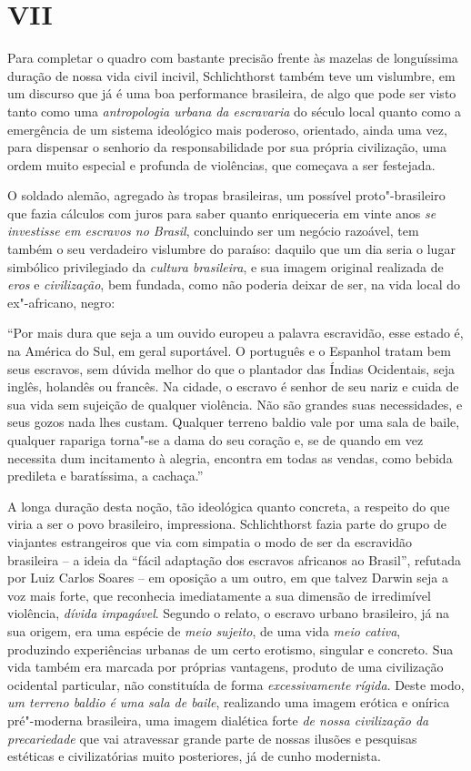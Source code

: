\section{VII}

Para completar o quadro com bastante precisão frente às mazelas de
longuíssima duração de nossa vida civil incivil, Schlichthorst também
teve um vislumbre, em um discurso que já é uma boa performance
brasileira, de algo que pode ser visto tanto como uma \emph{antropologia
urbana} \emph{da escravaria} do século  local quanto como a
emergência de um sistema ideológico mais poderoso, orientado, ainda uma
vez, para dispensar o senhorio da responsabilidade por sua própria
civilização, uma ordem muito especial e profunda de violências, que
começava a ser festejada.

O soldado alemão, agregado às tropas brasileiras, um possível
proto"-brasileiro que fazia cálculos com juros para saber quanto
enriqueceria em vinte anos \emph{se investisse em escravos no Brasil},
concluindo ser um negócio razoável, tem também o seu verdadeiro
vislumbre do paraíso: daquilo que um dia seria o lugar simbólico
privilegiado da \emph{cultura brasileira}, e sua imagem original
realizada de \emph{eros} e \emph{civilização}, bem fundada, como não
poderia deixar de ser, na vida local do ex"-africano, negro:

``Por mais dura que seja a um ouvido europeu a palavra escravidão, esse
estado é, na América do Sul, em geral suportável. O português e o
Espanhol tratam bem seus escravos, sem dúvida melhor do que o plantador
das Índias Ocidentais, seja inglês, holandês ou francês. Na cidade, o
escravo é senhor de seu nariz e cuida de sua vida sem sujeição de
qualquer violência. Não são grandes suas necessidades, e seus gozos nada
lhes custam. Qualquer terreno baldio vale por uma sala de baile,
qualquer rapariga torna"-se a dama do seu coração e, se de quando em vez
necessita dum incitamento à alegria, encontra em todas as vendas, como
bebida predileta e baratíssima, a cachaça.''

A longa duração desta noção, tão ideológica quanto concreta, a respeito
do que viria a ser o povo brasileiro, impressiona. Schlichthorst fazia
parte do grupo de viajantes estrangeiros que via com simpatia o modo de
ser da escravidão brasileira -- a ideia da ``fácil adaptação dos
escravos africanos ao Brasil'', refutada por Luiz Carlos Soares -- em
oposição a um outro, em que talvez Darwin seja a voz mais forte, que
reconhecia imediatamente a sua dimensão de irredimível violência,
\emph{dívida impagável}. Segundo o relato, o escravo urbano brasileiro,
já na sua origem, era uma espécie de \emph{meio sujeito}, de uma vida
\emph{meio cativa}, produzindo experiências urbanas de um certo
erotismo, singular e concreto. Sua vida também era marcada por próprias
vantagens, produto de uma civilização ocidental particular, não
constituída de forma \emph{excessivamente rígida}. Deste modo, \emph{um
terreno baldio} \emph{é uma sala de baile}, realizando uma imagem
erótica e onírica pré"-moderna brasileira, uma imagem dialética forte
\emph{de nossa civilização da precariedade} que vai
atravessar grande parte de nossas ilusões e pesquisas estéticas e
civilizatórias muito posteriores, já de cunho modernista.

